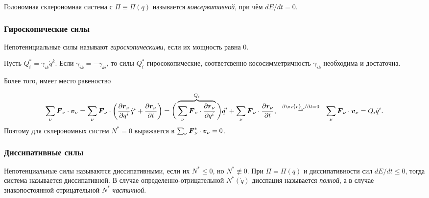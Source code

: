 \begin{to_def} 
    Голономная склерономная система с  $\Pi \equiv \Pi(q)$ называется \textit{консервативной}, при чём $d E / d t = 0$.
\end{to_def}

\subsubsection*{Гироскопические силы}


\begin{to_def} 
    Непотенициальные силы называют \textit{гироскопическими}, если их мощность равна $0$. 
\end{to_def}


Пусть $Q_i^* = \gamma_{ik} \dot{q}^k$. Если $\gamma_{ik} = -\gamma_{ki}$, то силы $Q_i^*$ гиросокопические, соответсвенно кососимметричность $\gamma_{ik}$ необходима и достаточна.

Более того, имеет место равеноство

\vspace{-25pt}
\begin{equation*}
    \sum_\nu \vc{F}_\nu \cdot \vc{v}_\nu = \sum_\nu \vc{F}_\nu \cdot
    \left(
        \frac{\partial \vc{r}_\nu}{\partial q^i} \dot{q}^i + \frac{\partial \vc{r}_\nu}{\partial t} 
    \right) 
    =
     \bigg(
     \overbrace{
     \sum_\nu \vc{F}_\nu \cdot \frac{\partial \vc{r}_\nu}{\partial q^i}
     }^{
     Q_i
     }
      \bigg)
     \dot{q}^i + \sum_\nu \vc{F}_\nu \cdot \frac{\partial \vc{r}_\nu}{\partial t},
     \hspace{0.25cm} \overset{\partial \vv{r}_\nu / \partial t = 0}{=}  \hspace{0.25cm} 
     \sum_\nu \vc{F}_\nu \cdot \vc{v}_\nu = Q_i \dot{q}^i.
\end{equation*}
Поэтому для склерономных систем $N^* = 0$ выражается в $\sum_\nu \mbox{\boldmath $F$}_\nu^* \cdot \mbox{\boldmath $v$}_\nu = 0$.

\subsubsection*{Диссипативные силы}

\begin{to_def} 
    Непотенциальные силы называются диссипативными, если их $N^* \leq 0$, но $N^* \not \equiv 0$. При $\Pi = \Pi(q)$ и диссипативности сил $d E / dt \leq 0$, тогда система называется диссипативной. В случае определенно-отрицательной $N^* (\dot{q})$ дисспация называется \textit{полной}, а в случае знакопостоянной отрицательной $N^*$ \textit{частичной}.
\end{to_def}

